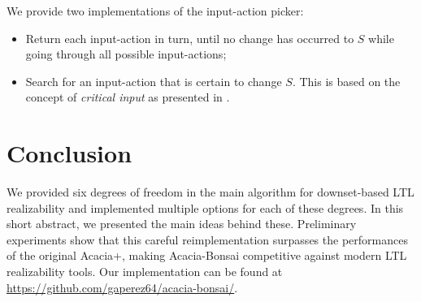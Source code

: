 \documentclass[sigconf,screen,nonacm]{acmart}
\begin{document}
We provide two implementations of the input-action picker:
\begin{itemize}
\item Return each input-action in turn, until no change has occurred to \(S\)
  while going through all possible input-actions;
\item Search for an input-action that is certain to change \(S\).  This is based
  on the concept of \emph{critical input} as presented in \cite{...}.
\end{itemize}

\section{Conclusion}

We provided six degrees of freedom in the main algorithm for downset-based LTL
realizability and implemented multiple options for each of these degrees.  In
this short abstract, we presented the main ideas behind these.  Preliminary
experiments show that this careful reimplementation surpasses the performances
of the original Acacia+, making Acacia-Bonsai competitive against modern LTL
realizability tools.  Our implementation can be found at
\url{https://github.com/gaperez64/acacia-bonsai/}.
\end{document}
